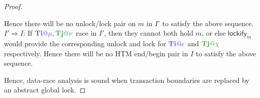 \documentclass{article}
\begin{document}
\begin{proof}
\begin{itemize}
\begin{itemize}
				Hence there will be no unlock/lock pair on $m$ in $I'$ to satisfy the above sequence.
			\llitem $I' \Rightarrow I$:
				If $\tiiat{\mu},\tjjat{\nu}$ race in $I'$,
				then they cannot both hold $m$,
				or else $\mathsf{lockify}_m$ would provide the corresponding
				unlock and lock for $\tiiat{\epsilon}$ and $\tjjat{\chi}$ respectively.
				Hence there will be no HTM end/begin pair in $I$ to satisfy the above sequence.
		\end{itemize}
\end{itemize}
Hence, data-race analysis is sound when transaction boundaries are replaced by an abstract global lock.
\end{proof}
\end{document}
